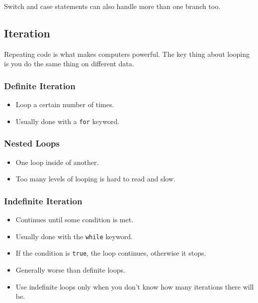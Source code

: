 \begin{note}
	Switch and case statements can also handle more than one branch too.
\end{note}

\subsection{Iteration}\label{sub:iteration}

Repeating code is what makes computers powerful.
The key thing about looping is you do the same thing on different data.

\subsubsection{Definite Iteration}\label{ssub:definite-iteration}

\begin{itemize}
	\item Loop a certain number of times.
	\item Usually done with a \texttt{for} keyword.
\end{itemize}

\subsubsection{Nested Loops}\label{ssub:nested-loops}

\begin{itemize}
	\item One loop inside of another.
	\item Too many levels of looping is hard to read and slow.
\end{itemize}

\subsubsection{Indefinite Iteration}\label{ssub:indefinite-iteration}

\begin{itemize}
	\item Continues until some condition is met.
	\item Usually done with the \texttt{while} keyword.
	\item If the condition is \texttt{true}, the loop continues, otherwise it stops.
	\item Generally worse than definite loops.
	\item Use indefinite loops only when you don't know how many iterations there will be.
\end{itemize}
